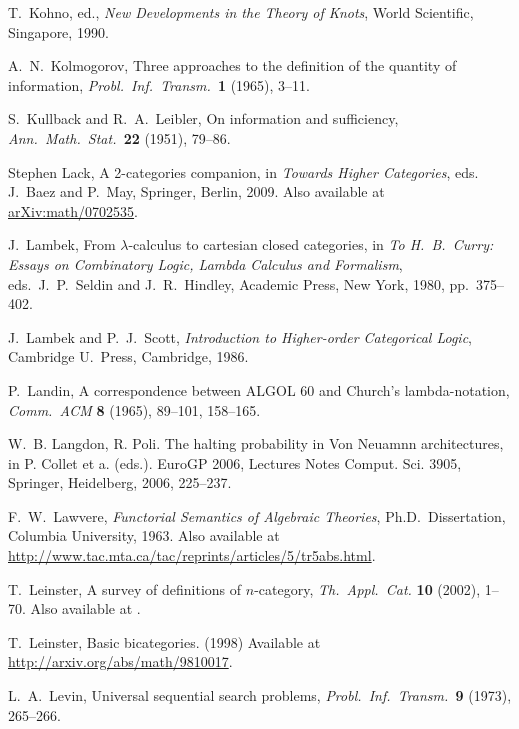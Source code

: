 \documentclass[12pt,twoside,openright]{report}
\begin{document}
\begin{thebibliography}{99}
T.\ Kohno, ed., \textsl{New Developments in the Theory of Knots}, World Scientific, Singapore, 1990.

 A.\ N.\ Kolmogorov, Three approaches to the definition of the quantity of information, 
{\sl Probl.\ Inf.\ Transm.\ }\textbf{1} (1965), 3--11.

 S.\ Kullback and R.\ A.\ Leibler, On information and sufficiency, \textsl{Ann.\ Math.\ Stat.\ }\textbf{22}
(1951), 79--86.

 Stephen Lack, A 2-categories companion, in \textsl{Towards Higher Categories}, eds. J.\ Baez and P.\ May, Springer, Berlin, 2009.  Also available at \href{http://arxiv.org/abs/math/0702535}{arXiv:math/0702535}.

 J.\ Lambek, From $\lambda$-calculus to cartesian closed categories, in {\sl To H.\ B.\ Curry: Essays on Combinatory Logic, Lambda Calculus and Formalism}, eds.\ J.\ P.\ Seldin and J.\
R.\ Hindley, Academic Press, New York, 1980, pp.\ 375--402. 

 J.\ Lambek and P.\ J.\ Scott, {\sl Introduction to Higher-order Categorical Logic}, Cambridge U.\ Press, Cambridge,
1986.  

 P.\ Landin, A correspondence between ALGOL 60 and Church's lambda-notation, {\sl Comm.\ ACM} {\bf 8} (1965), 89--101,
158--165.

 W.~B. Langdon, R. Poli. The halting probability in Von Neuamnn architectures, in P. Collet et a. (eds.). EuroGP 2006, Lectures Notes Comput. Sci. 3905, Springer, Heidelberg, 2006, 225--237.

 F.\ W.\ Lawvere, {\sl Functorial Semantics of Algebraic Theories}, Ph.D.\ Dissertation, Columbia University, 1963. Also available at 
\href{http://www.tac.mta.ca/tac/reprints/articles/5/tr5abs.html}
{http://www.tac.mta.ca/tac/reprints/articles/5/tr5abs.html}.

T.\ Leinster, A survey of definitions of $n$-category,
\textsl{Th.\ Appl.\ Cat.} \textbf{10} (2002), 1--70. Also available at .

 T.\ Leinster, Basic bicategories. (1998)  Available at \href{http://arxiv.org/abs/math/9810017}{http://arxiv.org/abs/math/9810017}.

 L.\ A.\ Levin, Universal sequential search problems, \textit{Probl.\ Inf.\ Transm.\ }\textbf{9}
(1973), 265--266.


\end{thebibliography}
\end{document}
